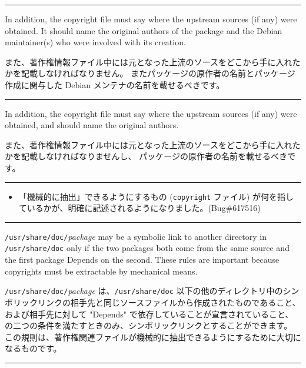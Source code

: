 \documentclass[mingoth,a4paper]{jsarticle}
\begin{document}
\vspace{1ex}
\hrule
{}\par
\parbox{0.48\linewidth}{
	  In addition, the copyright file must say where the upstream
	  sources (if any) were obtained.  It should name the original
	  authors of the package and the Debian maintainer(s) who were
	  involved with its creation.
}\hfil 
\parbox{0.48\linewidth}{
	  また、著作権情報ファイル中には元となった上流のソースをどこから手に入れたかを記載しなければなりません。
	  またパッケージの原作者の名前とパッケージ作成に関与した
	  Debian メンテナの名前を載せるべきです。
}
\hrule

\par
\parbox{0.48\linewidth}{
	  In addition, the copyright file must say where the upstream
	  sources (if any) were obtained, and should name the original
	  authors.
}\hfil 
\parbox{0.48\linewidth}{
	  また、著作権情報ファイル中には元となった上流のソースをどこから手に入れたかを記載しなければなりませんし、
	  パッケージの原作者の名前を載せるべきです。
}
\hrule
\vspace{1ex}

\clearpage

\begin{itemize}
\item 「機械的に抽出」できるようにするもの ({\tt copyright} ファイル) が何を指しているかが、明確に記述されるようになりました。(Bug\#617516)
\end{itemize}

\vspace{1ex}
\hrule
{}\par
\parbox{0.48\linewidth}{
	  {\tt /usr/share/doc/}{\it package} may be a symbolic
	  link to another directory in {\tt /usr/share/doc} only if
	  the two packages both come from the same source and the
	  first package Depends on the second.  These rules are
	  important because copyrights must be extractable by
	  mechanical means.
}\hfil 
\parbox{0.48\linewidth}{
	  {\tt/usr/share/doc/}{\it package}
	  は、{\tt /usr/share/doc}
	  以下の他のディレクトリ中のシンボリックリンクの相手先と同じソースファイルから作成されたものであること、および相手先に対して
	  "Depends" で依存していることが宣言されていること、の二つの条件を満たすときのみ、シンボリックリンクとすることができます。
	  この規則は、著作権関連ファイルが機械的に抽出できるようにするために大切になるものです。
}
\hrule
\end{document}
